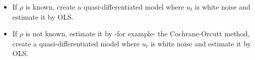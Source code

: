 \documentclass[10pt, a4paper, landscape]{article}
\begin{document}
\begin{multicols}{3}
\begin{itemize}[leftmargin=*]
			\begin{itemize}[leftmargin=*]
				\item If $\rho$ is known, create a quasi-differentiated model where $u_{t}$ is white noise and estimate it by OLS.
				\item If $\rho$ is not known, estimate it by -for example- the Cochrane-Orcutt method, create a quasi-differentiated model where $u_{t}$ is white noise and estimate it by OLS.
			\end{itemize}
		\end{itemize}
	\end{multicols}
\end{document}

